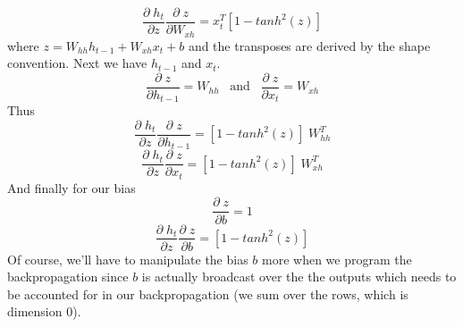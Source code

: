 \documentclass[12pt]{article}
\begin{document}
\begin{equation*}
    \frac{\partial \; h_t}{\partial z} \frac{\partial \; z}{\partial W_{xh}} = 
    x_t^T [1 - tanh^2(z)]
\end{equation*}
where $z = W_{hh}h_{t-1} + W_{xh}x_t + b$ and the transposes are derived by the shape 
convention. Next we have $h_{t-1}$ and $x_t$. 
\begin{equation*}
    \frac{\partial \; z}{\partial h_{t-1}} = W_{hh} \; \; \; \text{and} \; \; \;
    \frac{\partial \; z}{\partial x_t} = W_{xh}
\end{equation*}
Thus 
\begin{equation*}
    \frac{\partial \; h_t}{\partial z} \frac{\partial \; z}{\partial h_{t-1}} = 
    [1 - tanh^2(z)] \; W_{hh}^T 
\end{equation*}
\begin{equation*}
    \frac{\partial \; h_t}{\partial z} \frac{\partial \; z}{\partial x_t} = 
    [1 - tanh^2(z)] \; W_{xh}^T 
\end{equation*}
And finally for our bias 
\begin{equation*}
    \frac{\partial \; z}{\partial b} = 1
\end{equation*} \begin{equation*}
    \frac{\partial \; h_t}{\partial z} \frac{\partial \; z}{\partial b} = 
    [1 - tanh^2(z)] 
\end{equation*}
Of course, we'll have to manipulate the bias $b$ more when we program the backpropagation 
since $b$ is actually broadcast over the the outputs which needs to be accounted for 
in our backpropagation (we sum over the rows, which is dimension 0). 
\end{document}
